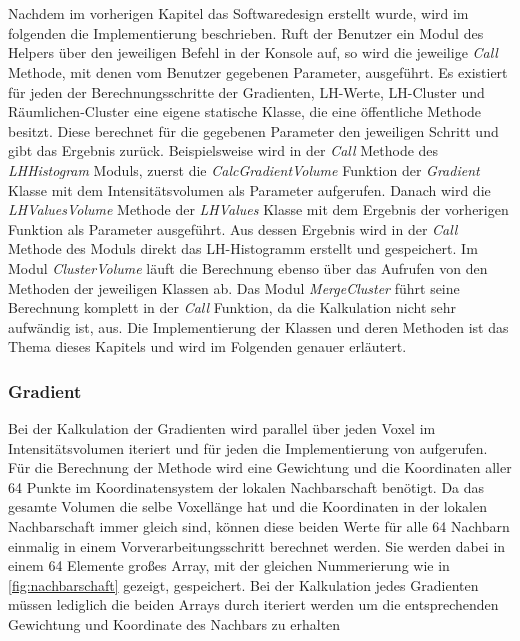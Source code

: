 \chapter{}
\label{sec:implementation}




Nachdem im vorherigen Kapitel das Softwaredesign erstellt wurde, wird im folgenden die Implementierung beschrieben.
\newline
Ruft der Benutzer ein Modul des Helpers über den jeweiligen Befehl in der Konsole auf, so wird die jeweilige \textit{Call} Methode, mit denen vom Benutzer gegebenen Parameter, ausgeführt.
Es existiert für jeden der Berechnungsschritte der Gradienten, LH-Werte, LH-Cluster und Räumlichen-Cluster eine eigene statische Klasse, die eine öffentliche Methode besitzt. Diese berechnet für die gegebenen Parameter den jeweiligen Schritt und gibt das Ergebnis zurück. 
Beispielsweise wird in der \textit{Call} Methode des \textit{LHHistogram} Moduls, zuerst die \textit{CalcGradientVolume} Funktion der \textit{Gradient} Klasse mit dem Intensitätsvolumen als Parameter aufgerufen. Danach wird die \textit{LHValuesVolume} Methode der \textit{LHValues} Klasse mit dem Ergebnis der vorherigen Funktion als Parameter ausgeführt. Aus dessen Ergebnis wird in der \textit{Call} Methode des Moduls direkt das LH-Histogramm erstellt und gespeichert.
Im Modul \textit{ClusterVolume} läuft die Berechnung ebenso über das Aufrufen von den Methoden der jeweiligen Klassen ab.
Das Modul \textit{MergeCluster} führt seine Berechnung komplett in der \textit{Call} Funktion, da die Kalkulation nicht sehr aufwändig ist, aus.
Die Implementierung der Klassen und deren Methoden ist das Thema dieses Kapitels und wird im Folgenden genauer erläutert.



\subsection{Gradient}

Bei der  Kalkulation der Gradienten wird parallel über jeden Voxel im Intensitätsvolumen iteriert und für jeden die Implementierung von \cite{hong2003method} aufgerufen.
\newline
Für die Berechnung der Methode wird eine Gewichtung und die Koordinaten aller 64 Punkte im Koordinatensystem der lokalen Nachbarschaft benötigt. Da das gesamte Volumen die selbe Voxellänge hat und die Koordinaten in der lokalen Nachbarschaft immer gleich sind, können diese beiden Werte für alle 64 Nachbarn einmalig in einem Vorverarbeitungsschritt berechnet werden. Sie werden dabei in einem 64 Elemente großes Array, mit der gleichen Nummerierung wie in \autoref{fig:nachbarschaft} gezeigt, gespeichert. Bei der Kalkulation jedes Gradienten müssen lediglich die beiden Arrays durch iteriert werden um die entsprechenden Gewichtung und Koordinate  des Nachbars zu erhalten

